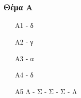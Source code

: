 \documentclass[12pt]{article}
\begin{document}
  \part*{}

  \section*{Θέμα Α}
  \begin{enumerate}
    \item [A1] - δ
    \item [A2] - γ
    \item [A3] - α
    \item [A4] - δ
    \item [A5]  Λ - Σ - Σ - Σ - Λ
  \end{enumerate}
\end{document}
